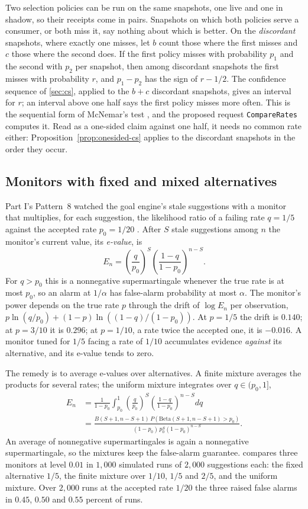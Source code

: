 \documentclass[11pt]{article}
\newcommand{\code}[1]{\texttt{#1}}
\theoremstyle{definition}
\theoremstyle{plain}
\begin{document}
Two selection policies can be run on the same snapshots, one live and one in shadow, so their
receipts come in pairs. Snapshots on which both policies serve a consumer, or both miss it, say
nothing about which is better. On the \emph{discordant} snapshots, where exactly one misses, let
$b$ count those where the first misses and $c$ those where the second does. If the first policy
misses with probability $p_1$ and the second with $p_2$ per snapshot, then among discordant
snapshots the first misses with probability $r$, and $p_1-p_2$ has the sign of $r-1/2$. The
confidence sequence of \cref{sec:cs}, applied to the $b+c$ discordant snapshots, gives an interval
for $r$; an interval above one half says the first policy misses more often. This is the sequential
form of McNemar's test \cite{mcnemar}, and the proposed request \code{CompareRates} computes it. Read
as a one-sided claim against one half, it needs no common rate either: Proposition~\ref{prop:onesided-cs}
applies to the discordant snapshots in the order they occur.

\subsection{Monitors with fixed and mixed alternatives}\label{sec:monitors}

Part I's Pattern~8 watched the goal engine's stale suggestions with a monitor that multiplies, for
each suggestion, the likelihood ratio of a failing rate $q=1/5$ against the accepted rate
$p_0=1/20$ \cite[Section~11]{part1}. After $S$ stale suggestions among $n$ the monitor's current
value, its \emph{e-value}, is
\[
E_n=\left(\frac{q}{p_0}\right)^{S}\left(\frac{1-q}{1-p_0}\right)^{n-S}.
\]
For $q>p_0$ this is a nonnegative supermartingale whenever the true rate is at most $p_0$, so an
alarm at $1/\alpha$ has false-alarm probability at most $\alpha$. The monitor's power depends on the
true rate $p$ through the drift of $\log E_n$ per observation,
$p\ln(q/p_0)+(1-p)\ln((1-q)/(1-p_0))$. At $p=1/5$ the drift is $0.140$; at $p=3/10$ it is $0.296$;
at $p=1/10$, a rate twice the accepted one, it is $-0.016$. A monitor tuned for $1/5$ facing a rate
of $1/10$ accumulates evidence \emph{against} its alternative, and its e-value tends to zero.

The remedy is to average e-values over alternatives. A finite mixture averages the products for
several rates; the uniform mixture integrates over $q\in(p_0,1]$,
\begin{align*}
E_n&=\frac{1}{1-p_0}\int_{p_0}^{1}\left(\frac{q}{p_0}\right)^{S}
     \left(\frac{1-q}{1-p_0}\right)^{n-S}dq\\
   &=\frac{B(S+1,n-S+1)\,P(\mathrm{Beta}(S+1,n-S+1)>p_0)}{(1-p_0)\,p_0^{S}(1-p_0)^{n-S}}.
\end{align*}
An average of nonnegative supermartingales is again a nonnegative supermartingale, so the mixtures
keep the false-alarm guarantee.  compares three monitors at level $0.01$ in
$1{,}000$ simulated runs of $2{,}000$ suggestions each: the fixed alternative $1/5$, the finite
mixture over $1/10$, $1/5$ and $2/5$, and the uniform mixture. Over $2{,}000$ runs at the accepted
rate $1/20$ the three raised false alarms in $0.45$, $0.50$ and $0.55$ percent of runs.
\end{document}
